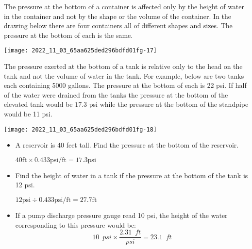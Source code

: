 The pressure at the bottom of a container is affected only by the height of water in the container and not by the shape or the volume of the container. In the drawing below there are four containers all of different shapes and sizes. The pressure at the bottom of each is the same.

\begin{center}
\texttt{[image: 2022\_11\_03\_65aa625ded296bdfd01fg-17]}
\end{center}
The pressure exerted at the bottom of a tank is relative only to the head on the tank and not the volume of water in the tank. For example, below are two tanks each containing 5000 gallons. The pressure at the bottom of each is 22 psi. If half of the water were drained from the tanks the pressure at the bottom of the elevated tank would be $17.3$ psi while the pressure at the bottom of the standpipe would be 11 psi.\\

\begin{center}
\texttt{[image: 2022\_11\_03\_65aa625ded296bdfd01fg-18]}
\end{center}


\begin{itemize}
\item A reservoir is 40 feet tall. Find the pressure at the bottom of the reservoir.

$40 \mathrm{ft} \times 0.433 \mathrm{psi} / \mathrm{ft}=17.3 \mathrm{psi}$

\vspace{0.4cm}

\item Find the height of water in a tank if the pressure at the bottom of the tank is 12 psi.

$12 \mathrm{psi} \div 0.433 \mathrm{psi} / \mathrm{ft}=27.7 \mathrm{ft}$

\vspace{0.4cm}

\item If a pump discharge pressure gauge read 10 psi, the height of the water corresponding to this pressure would be:
$$10 \enspace psi \times \dfrac{2.31 \enspace ft}{psi}=23.1 \enspace ft$$\\
\vspace{0.4cm}
\end{itemize}

